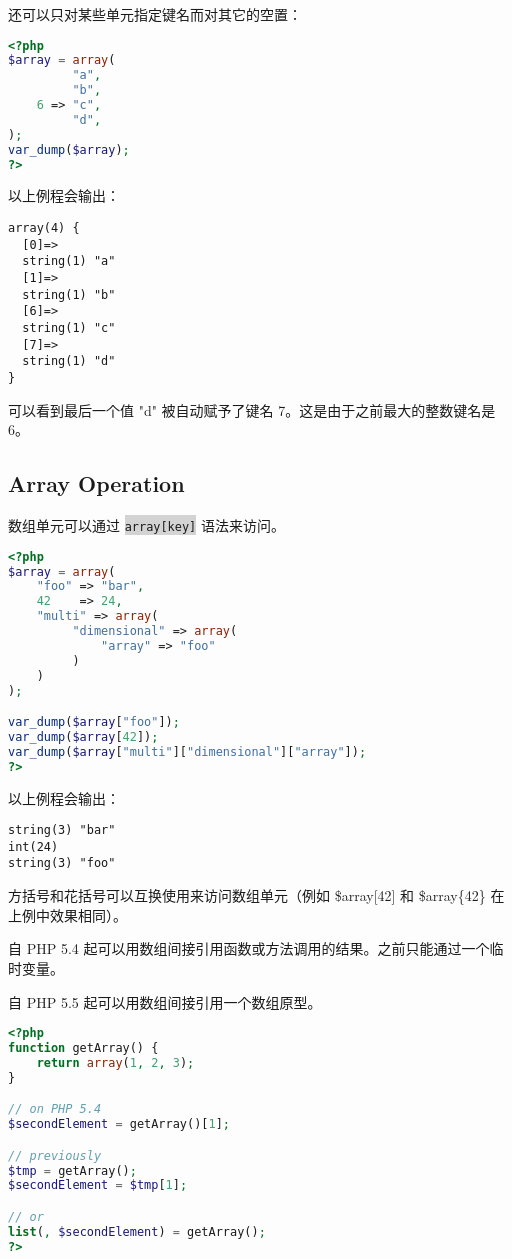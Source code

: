 还可以只对某些单元指定键名而对其它的空置：

\begin{lstlisting}[language=PHP]
<?php
$array = array(
         "a",
         "b",
    6 => "c",
         "d",
);
var_dump($array);
?>
\end{lstlisting}


以上例程会输出：


\begin{verbatim}
array(4) {
  [0]=>
  string(1) "a"
  [1]=>
  string(1) "b"
  [6]=>
  string(1) "c"
  [7]=>
  string(1) "d"
}
\end{verbatim}

可以看到最后一个值 "d" 被自动赋予了键名 7。这是由于之前最大的整数键名是 6。

\subsection{Array Operation}

数组单元可以通过 \colorbox{lightgray}{\texttt{array[key]}} 语法来访问。

\begin{lstlisting}[language=PHP]
<?php
$array = array(
    "foo" => "bar",
    42    => 24,
    "multi" => array(
         "dimensional" => array(
             "array" => "foo"
         )
    )
);

var_dump($array["foo"]);
var_dump($array[42]);
var_dump($array["multi"]["dimensional"]["array"]);
?>
\end{lstlisting}

以上例程会输出：


\begin{verbatim}
string(3) "bar"
int(24)
string(3) "foo"
\end{verbatim}

方括号和花括号可以互换使用来访问数组单元（例如 \$array[42] 和 \$array\{42\} 在上例中效果相同）。

自 PHP 5.4 起可以用数组间接引用函数或方法调用的结果。之前只能通过一个临时变量。

自 PHP 5.5 起可以用数组间接引用一个数组原型。

\begin{lstlisting}[language=PHP]
<?php
function getArray() {
    return array(1, 2, 3);
}

// on PHP 5.4
$secondElement = getArray()[1];

// previously
$tmp = getArray();
$secondElement = $tmp[1];

// or
list(, $secondElement) = getArray();
?>
\end{lstlisting}

